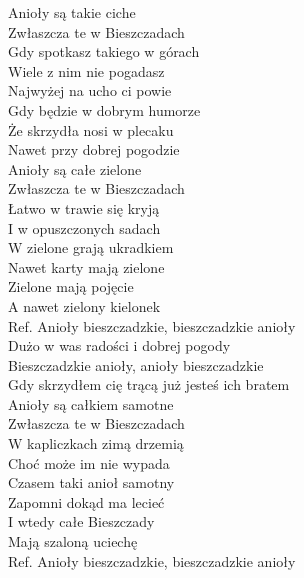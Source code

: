 
\begin{flushleft}
Anioły są takie ciche\tab{} \\
Zwłaszcza te w Bieszczadach \tab{}\\
Gdy spotkasz takiego w górach\tab{} \\
Wiele z nim nie pogadasz \tab{}\\
Najwyżej na ucho ci powie \tab{}\\
Gdy będzie w dobrym humorze \\
Że skrzydła nosi w plecaku \\
Nawet przy dobrej pogodzie \tab{}\\
\vskip 3mm
Anioły są całe zielone \\
Zwłaszcza te w Bieszczadach \\
Łatwo w trawie się kryją \\
I w opuszczonych sadach \\
W zielone grają ukradkiem \\
Nawet karty mają zielone \\
Zielone mają pojęcie \\
A nawet zielony kielonek \\
\vskip 3mm
Ref. Anioły bieszczadzkie, bieszczadzkie anioły  \\
\hspace{0.9cm}Dużo w was radości i dobrej pogody \tab{}\\
\hspace{0.9cm}Bieszczadzkie anioły, anioły bieszczadzkie  \\
\hspace{0.9cm}Gdy skrzydłem cię trącą już jesteś ich bratem \\
\vskip 3mm
Anioły są całkiem samotne \\
Zwłaszcza te w Bieszczadach \\
W kapliczkach zimą drzemią \\
Choć może im nie wypada \\
Czasem taki anioł samotny \\
Zapomni dokąd ma lecieć \\
I wtedy całe Bieszczady \\
Mają szaloną uciechę \\
\vskip 3mm
Ref. Anioły bieszczadzkie, bieszczadzkie anioły \\

\end{flushleft}
